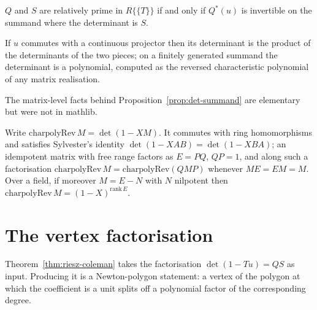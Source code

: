 \begin{lemma}
  \label{lem:coprime-iff-unit}
  \leanok
  $Q$ and $S$ are relatively prime in $R\{\{T\}\}$ if and only if $Q^{*}(u)$ is invertible on
  the summand where the determinant is $S$.
\end{lemma}

\begin{proposition}
  \label{prop:det-summand}
  \leanok
  If $u$ commutes with a continuous projector then its determinant is the product of the
  determinants of the two pieces; on a finitely generated summand the determinant is a
  polynomial, computed as the reversed characteristic polynomial of any matrix realisation.
\end{proposition}

The matrix-level facts behind Proposition~\ref{prop:det-summand} are elementary but were not in
mathlib.

\begin{lemma}
  \label{lem:charpolyrev}
  \leanok
  Write $\mathrm{charpolyRev}\,M = \det(1 - XM)$.  It commutes with ring homomorphisms and
  satisfies Sylvester's identity $\det(1-XAB) = \det(1-XBA)$; an idempotent matrix with free
  range factors as $E = PQ$, $QP = 1$, and along such a factorisation
  $\mathrm{charpolyRev}\,M = \mathrm{charpolyRev}(QMP)$ whenever $ME = EM = M$.  Over a field,
  if moreover $M = E - N$ with $N$ nilpotent then
  $\mathrm{charpolyRev}\,M = (1-X)^{\mathrm{rank}\,E}$.
\end{lemma}

\section{The vertex factorisation}

Theorem~\ref{thm:riesz-coleman} takes the factorisation $\det(1-Tu) = QS$ as input.  Producing
it is a Newton-polygon statement: a vertex of the polygon at which the coefficient is a unit
splits off a polynomial factor of the corresponding degree.

